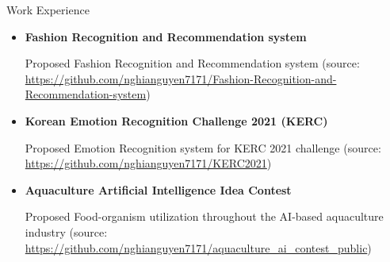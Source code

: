 \begin{rubric}{Work Experience}
\begin{itemize}
        \item \textbf{Fashion Recognition and Recommendation system}\par
        Proposed Fashion Recognition and Recommendation system (source: \url{https://github.com/nghianguyen7171/Fashion-Recognition-and-Recommendation-system})

        \item \textbf{Korean Emotion Recognition Challenge 2021 (KERC)}\par
        Proposed Emotion Recognition system for KERC 2021 challenge (source: \url{https://github.com/nghianguyen7171/KERC2021})

        \item \textbf{Aquaculture Artificial Intelligence Idea Contest}\par
        Proposed Food-organism utilization throughout the AI-based aquaculture industry (source: \url{https://github.com/nghianguyen7171/aquaculture_ai_contest_public})
   \end{itemize}

\end{rubric}